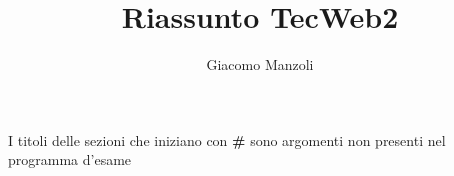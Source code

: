 \documentclass[a4paper, 11pt]{article}
\begin{document}
\title{Riassunto TecWeb2}
\author{Giacomo Manzoli}
\maketitle

I titoli delle sezioni che iniziano con \textbf{\#} sono argomenti non presenti nel programma d'esame


\pagebreak

\tableofcontents

\pagebreak







\end{document}
